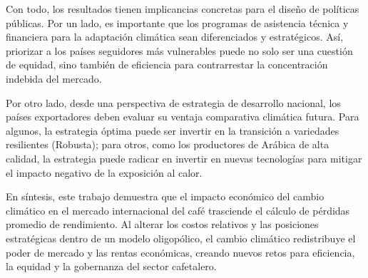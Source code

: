 Con todo, los resultados tienen implicancias concretas para el diseño de políticas públicas. Por un lado, es importante que los programas de asistencia técnica y financiera para la adaptación climática sean diferenciados y estratégicos. Así, priorizar a los países seguidores más vulnerables puede no solo ser una cuestión de equidad, sino también de eficiencia para contrarrestar la concentración indebida del mercado.

Por otro lado, desde una perspectiva de estrategia de desarrollo nacional, los países exportadores deben evaluar su ventaja comparativa climática futura. Para algunos, la estrategia óptima puede ser invertir en la transición a variedades resilientes (Robusta); para otros, como los productores de Arábica de alta calidad, la estrategia puede radicar en invertir en nuevas tecnologías para mitigar el impacto negativo de la exposición al calor.

En síntesis, este trabajo demuestra que el impacto económico del cambio climático en el mercado internacional del café trasciende el cálculo de pérdidas promedio de rendimiento. Al alterar los costos relativos y las posiciones estratégicas dentro de un modelo oligopólico, el cambio climático redistribuye el poder de mercado y las rentas económicas, creando nuevos retos para eficiencia, la equidad y la gobernanza del sector cafetalero.